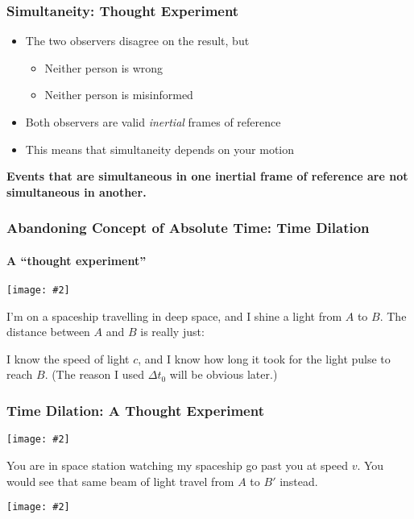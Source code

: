 \documentclass[12pt,compress,aspectratio=169]{beamer}
\newcommand{\pic}[2]{\texttt{[image: \#2]}}
\begin{document}


\begin{frame}
  \frametitle{Simultaneity: Thought Experiment}
  \begin{itemize}
  \item The two observers disagree on the result, but
    \begin{itemize}
    \item Neither person is wrong
    \item Neither person is misinformed
    \end{itemize}
  \item Both observers are valid \emph{inertial} frames of reference
  \item This means that simultaneity depends on your motion
  \end{itemize}
  
  \vspace{.2in}\textbf{Events that are simultaneous in one inertial frame of
    reference are not simultaneous in another.}
\end{frame}

\begin{frame}
  \frametitle{Abandoning Concept of Absolute Time: Time Dilation}
  \framesubtitle{A ``thought experiment''}
  \begin{center}
    \pic{.7}{graphics/spaceship.png}
  \end{center}
  I'm on a spaceship travelling in deep space, and I shine a light from
  $A$ to $B$. The distance between $A$ and $B$ is really just:

  \vspace{-.3in}{\Large
    \begin{displaymath}
      |AB|=c\Delta t_0
    \end{displaymath}
  }

  \vspace{-.2in}I know the speed of light $c$, and I know how long it took for
  the light pulse to reach $B$. (The reason I used $\Delta t_0$ will be obvious
  later.)
\end{frame}


\begin{frame}
  \frametitle{Time Dilation: A Thought Experiment}
  \begin{center}
    \pic{.7}{graphics/spaceship.png}
  \end{center}
  You are in space station watching my spaceship go past you at speed $v$. You
  would see that same beam of light travel from $A$ to $B'$ instead.
  \begin{center}
    \pic{.7}{graphics/light-a-b-prime.png}
  \end{center}
\end{frame}
\end{document}
